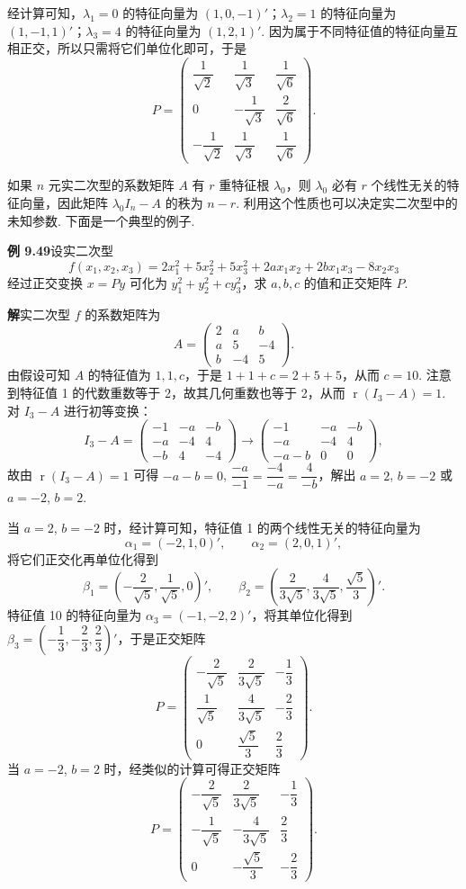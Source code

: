 \documentclass[UTF8,12pt,a4paper,fontset=fandol]{ctexart}
\begin{document}
经计算可知，$\lambda_1=0$ 的特征向量为 $(1,0,-1)'$；$\lambda_2=1$ 的特征向量为 $(1,-1,1)'$；$\lambda_3=4$ 的特征向量为 $(1,2,1)'$. 因为属于不同特征值的特征向量互相正交，所以只需将它们单位化即可，于是
\[
P=\begin{pmatrix}
\dfrac1{\sqrt2}&\dfrac1{\sqrt3}&\dfrac1{\sqrt6}\\
0&-\dfrac1{\sqrt3}&\dfrac2{\sqrt6}\\
-\dfrac1{\sqrt2}&\dfrac1{\sqrt3}&\dfrac1{\sqrt6}
\end{pmatrix}.
\]

如果 $n$ 元实二次型的系数矩阵 $A$ 有 $r$ 重特征根 $\lambda_0$，则 $\lambda_0$ 必有 $r$ 个线性无关的特征向量，因此矩阵 $\lambda_0I_n-A$ 的秩为 $n-r$. 利用这个性质也可以决定实二次型中的未知参数. 下面是一个典型的例子.

\noindent\textbf{例 9.49}\quad 设实二次型
\[
f(x_1,x_2,x_3)=2x_1^2+5x_2^2+5x_3^2+2ax_1x_2+2bx_1x_3-8x_2x_3
\]
经过正交变换 $x=Py$ 可化为 $y_1^2+y_2^2+cy_3^2$，求 $a,b,c$ 的值和正交矩阵 $P$.

\noindent\textbf{解}\quad 实二次型 $f$ 的系数矩阵为
\[
A=\begin{pmatrix}
2&a&b\\
a&5&-4\\
b&-4&5
\end{pmatrix}.
\]
由假设可知 $A$ 的特征值为 $1,1,c$，于是 $1+1+c=2+5+5$，从而 $c=10$. 注意到特征值 1 的代数重数等于 2，故其几何重数也等于 2，从而 $\operatorname{r}(I_3-A)=1$. 对 $I_3-A$ 进行初等变换：
\[
I_3-A=
\begin{pmatrix}
-1&-a&-b\\
-a&-4&4\\
-b&4&-4
\end{pmatrix}
\longrightarrow
\begin{pmatrix}
-1&-a&-b\\
-a&-4&4\\
-a-b&0&0
\end{pmatrix},
\]
故由 $\operatorname{r}(I_3-A)=1$ 可得 $-a-b=0$, $\dfrac{-a}{-1}=\dfrac{-4}{-a}=\dfrac{4}{-b}$，解出 $a=2$, $b=-2$ 或 $a=-2$, $b=2$.

当 $a=2$, $b=-2$ 时，经计算可知，特征值 1 的两个线性无关的特征向量为
\[
\alpha_1=(-2,1,0)',\qquad \alpha_2=(2,0,1)',
\]
将它们正交化再单位化得到
\[
\beta_1=\left(-\frac2{\sqrt5},\frac1{\sqrt5},0\right)',\qquad
\beta_2=\left(\frac2{3\sqrt5},\frac4{3\sqrt5},\frac{\sqrt5}3\right)'.
\]
特征值 10 的特征向量为 $\alpha_3=(-1,-2,2)'$，将其单位化得到 $\beta_3=\left(-\dfrac13,-\dfrac23,\dfrac23\right)'$，于是正交矩阵
\[
P=\begin{pmatrix}
-\dfrac2{\sqrt5}&\dfrac2{3\sqrt5}&-\dfrac13\\
\dfrac1{\sqrt5}&\dfrac4{3\sqrt5}&-\dfrac23\\
0&\dfrac{\sqrt5}3&\dfrac23
\end{pmatrix}.
\]
当 $a=-2$, $b=2$ 时，经类似的计算可得正交矩阵
\[
P=\begin{pmatrix}
-\dfrac2{\sqrt5}&\dfrac2{3\sqrt5}&-\dfrac13\\
-\dfrac1{\sqrt5}&-\dfrac4{3\sqrt5}&\dfrac23\\
0&-\dfrac{\sqrt5}3&-\dfrac23
\end{pmatrix}.
\]
\end{document}

